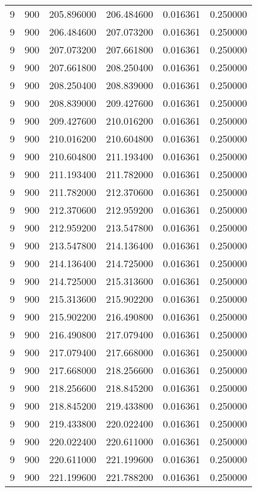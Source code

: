 \begin{longtable}{rrrrrr}
9 & 900 & 205.896000 & 206.484600 & 0.016361 & 0.250000 \\
9 & 900 & 206.484600 & 207.073200 & 0.016361 & 0.250000 \\
9 & 900 & 207.073200 & 207.661800 & 0.016361 & 0.250000 \\
9 & 900 & 207.661800 & 208.250400 & 0.016361 & 0.250000 \\
9 & 900 & 208.250400 & 208.839000 & 0.016361 & 0.250000 \\
9 & 900 & 208.839000 & 209.427600 & 0.016361 & 0.250000 \\
9 & 900 & 209.427600 & 210.016200 & 0.016361 & 0.250000 \\
9 & 900 & 210.016200 & 210.604800 & 0.016361 & 0.250000 \\
9 & 900 & 210.604800 & 211.193400 & 0.016361 & 0.250000 \\
9 & 900 & 211.193400 & 211.782000 & 0.016361 & 0.250000 \\
9 & 900 & 211.782000 & 212.370600 & 0.016361 & 0.250000 \\
9 & 900 & 212.370600 & 212.959200 & 0.016361 & 0.250000 \\
9 & 900 & 212.959200 & 213.547800 & 0.016361 & 0.250000 \\
9 & 900 & 213.547800 & 214.136400 & 0.016361 & 0.250000 \\
9 & 900 & 214.136400 & 214.725000 & 0.016361 & 0.250000 \\
9 & 900 & 214.725000 & 215.313600 & 0.016361 & 0.250000 \\
9 & 900 & 215.313600 & 215.902200 & 0.016361 & 0.250000 \\
9 & 900 & 215.902200 & 216.490800 & 0.016361 & 0.250000 \\
9 & 900 & 216.490800 & 217.079400 & 0.016361 & 0.250000 \\
9 & 900 & 217.079400 & 217.668000 & 0.016361 & 0.250000 \\
9 & 900 & 217.668000 & 218.256600 & 0.016361 & 0.250000 \\
9 & 900 & 218.256600 & 218.845200 & 0.016361 & 0.250000 \\
9 & 900 & 218.845200 & 219.433800 & 0.016361 & 0.250000 \\
9 & 900 & 219.433800 & 220.022400 & 0.016361 & 0.250000 \\
9 & 900 & 220.022400 & 220.611000 & 0.016361 & 0.250000 \\
9 & 900 & 220.611000 & 221.199600 & 0.016361 & 0.250000 \\
9 & 900 & 221.199600 & 221.788200 & 0.016361 & 0.250000 \\

\end{longtable}
